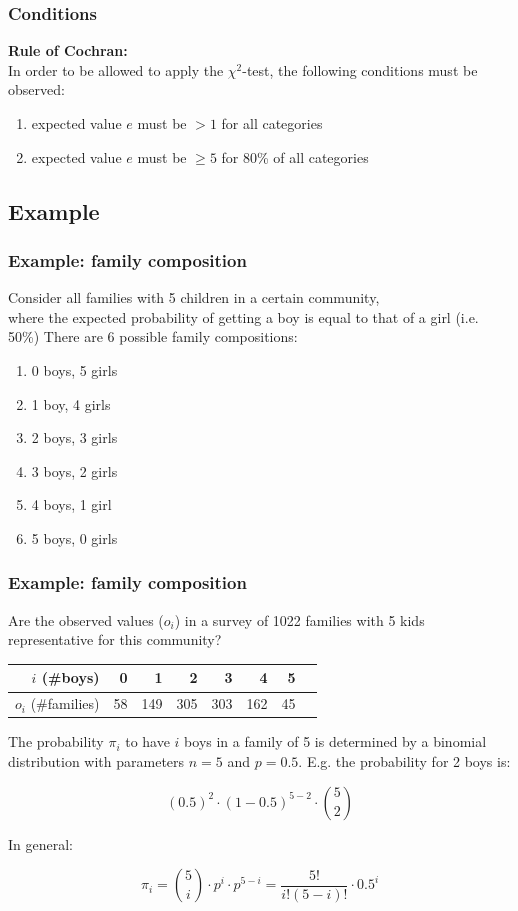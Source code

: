 \documentclass{beamer}
\begin{document}
\begin{frame}
\frametitle{Conditions}
\textbf{Rule of Cochran:}\\
In order to be allowed to apply the $\chi^2$-test, the following conditions must be observed: 
\begin{enumerate}
    \item expected value $e$ must be $>1$ for all categories
    \item expected value $e$ must be $\ge5$ for 80\% of all categories
\end{enumerate}
\end{frame}

\subsection{Example}

\begin{frame}
  \frametitle{Example: family composition}
  
  Consider all families with 5 children in a certain community,\\
  where the expected probability of getting a boy is equal to that of a girl (i.e. 50\%)
  \vfill
  \pause
  There are 6 possible family compositions:
  \begin{enumerate}
    \item 0 boys, 5 girls
    \item 1 boy, 4 girls
    \item 2 boys, 3 girls
    \item 3 boys, 2 girls
    \item 4 boys, 1 girl
    \item 5 boys, 0 girls
  \end{enumerate}

\end{frame}

\begin{frame}
  \frametitle{Example: family composition}
  Are the observed values ($o_i$) in a survey of 1022 families with 5 kids representative for this community?
  \begin{table}[h]
\begin{tabular}{@{}rrrrrrrr@{}}
\toprule
$i$ (\#boys)         & 0  & 1   & 2   & 3   & 4   & 5  &  \\ \midrule
$o_{i}$ (\#families) & 58 & 149 & 305 & 303 & 162 & 45 &  \\ \bottomrule
\end{tabular}
\end{table}
\pause
The probability $\pi_{i}$ to have $i$ boys in a family of 5 is determined by a binomial distribution with parameters $n=5$ and $p=0.5$. E.g. the probability for 2 boys is:

\[ (0.5)^{2} \cdot (1-0.5)^{5-2} \cdot \binom{5}{2} \]

In general:

\[ \pi_{i} = \binom{5}{i}\cdot p^{i} \cdot p^{5-i} = \frac{5!}{i!(5-i)!}\cdot 0.5^{i} \]
\end{frame}
\end{document}
